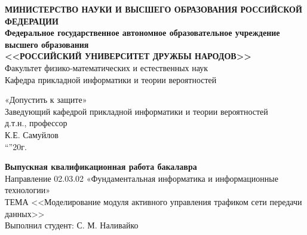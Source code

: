 \begin{titlepage}
  
  \begin{center}
    \textbf{МИНИСТЕРСТВО НАУКИ И ВЫСШЕГО ОБРАЗОВАНИЯ %
      РОССИЙСКОЙ ФЕДЕРАЦИИ\\
      Федеральное государственное автономное образовательное
      учреждение высшего образования\\
      <<РОССИЙСКИЙ УНИВЕРСИТЕТ ДРУЖБЫ НАРОДОВ>>}\\[5mm]
    Факультет физико-математических и естественных наук \\[2mm]
    Кафедра прикладной информатики и теории вероятностей

    \vfill

    \hfill
    \begin{minipage}{.5\textwidth}
      «Допустить к защите» \\ [2mm]
      Заведующий кафедрой прикладной информатики и теории вероятностей \\[2mm]
      д.т.н., профессор  \\[2mm]
      \underline{\hspace{3cm}} К.Е. Самуйлов \\
      ``\underline{\hspace{1cm}}''\underline{\hspace{3cm}}20\underline{\hspace{1cm}}г.
    \end{minipage}%

    \vfill

    \textbf{Выпускная квалификационная работа бакалавра} \\[3mm]

    Направление 02.03.02 «Фундаментальная информатика и информационные
    технологии»\\ [3mm]
  
    ТЕМА <<Моделирование модуля активного управления трафиком сети передачи данных>>\\[3mm]

    Выполнил студент: С. М. Наливайко
  \end{center}




\end{titlepage}
